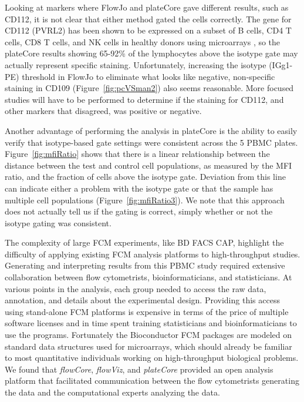\documentclass[12pt]{article}
\newcommand{\Rpackage}[1]{{\textit{#1}}}
\begin{document}
Looking at markers where FlowJo and plateCore gave different results, such as
CD112, it is not clear that either method gated the cells correctly.
The gene for CD112 (PVRL2) has been shown to be expressed on a subset of B cells,
CD4 T cells, CD8 T cells, and NK cells in healthy donors using microarrays
\citep{Critchley2007}, so the plateCore results showing 65-92\% of the
lymphocytes above the isotype gate may actually represent specific staining.
Unfortunately, increasing the isotype (IGg1-PE) threshold in FlowJo to
eliminate what looks like negative, non-specific staining in CD109
(Figure~\ref{fig:pcVSman2}) also seems reasonable. More focused studies will
have to be performed to determine if the staining for CD112, and other markers
that disagreed, was positive or negative.

Another advantage of performing the analysis in plateCore is the ability to
easily verify that isotype-based gate settings were consistent across the 5
PBMC plates. Figure~\ref{fig:mfiRatio} shows that there is a linear
relationship between the distance between the test and control cell
populations, as measured by the MFI ratio, and the fraction of cells above the
isotype gate. Deviation from this line can indicate either a problem with the
isotype gate or that the sample has multiple cell populations
(Figure~\ref{fig:mfiRatio3}). We note that this approach does not actually tell
us if the gating is correct, simply whether or not the isotype gating was
consistent.

The complexity of large FCM experiments, like BD FACS CAP, highlight the 
difficulty of applying existing FCM analysis platforms to high-throughput
studies. Generating and interpreting results from this PBMC study required
extensive collaboration between flow cytometrists, bioinformaticians, and
statisticians. At various points in the analysis, each group needed to access
the raw data, annotation, and details about the experimental design. Providing
this access using stand-alone FCM platforms is expensive in terms of the price
of multiple software licenses and in time spent training statisticians and
bioinformaticians to use the programs. Fortunately the Bioconductor FCM
packages are modeled on standard data structures used for microarrays, which
should already be familiar to most quantitative individuals working on
high-throughput biological problems. We found that \Rpackage{flowCore},
\Rpackage{flowViz}, and \Rpackage{plateCore} provided an open analysis platform
that facilitated communication between the flow cytometrists generating the
data and the computational experts analyzing the data.
\end{document}
